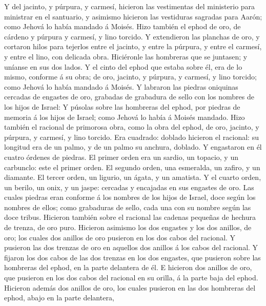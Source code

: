  Y del jacinto, y púrpura, y carmesí, hicieron las
vestimentas del ministerio para ministrar en el santuario, y asimismo
hicieron las vestiduras sagradas para Aarón; como Jehová lo había
mandado á Moisés.  Hizo también el ephod de oro, de cárdeno
y púrpura y carmesí, y lino torcido.  Y extendieron las
planchas de oro, y cortaron hilos para tejerlos entre el jacinto, y
entre la púrpura, y entre el carmesí, y entre el lino, con delicada
obra.  Hiciéronle las hombreras que se juntasen; y uníanse
en sus dos lados.  Y el cinto del ephod que estaba sobre él,
era de lo mismo, conforme á su obra; de oro, jacinto, y púrpura, y
carmesí, y lino torcido; como Jehová lo había mandado á Moisés.
 Y labraron las piedras oniquinas cercadas de engastes de
oro, grabadas de grabadura de sello con los nombres de los hijos de
Israel:  Y púsolas sobre las hombreras del ephod, por
piedras de memoria á los hijos de Israel; como Jehová lo había á Moisés
mandado.  Hizo también el racional de primorosa obra, como
la obra del ephod, de oro, jacinto, y púrpura, y carmesí, y lino
torcido.  Era cuadrado: doblado hicieron el racional: su
longitud era de un palmo, y de un palmo su anchura, doblado.
 Y engastaron en él cuatro órdenes de piedras. El primer
orden era un sardio, un topacio, y un carbunclo: este el primer orden.
 El segundo orden, una esmeralda, un zafiro, y un diamante.
 El tercer orden, un ligurio, un ágata, y un amatista.
 Y el cuarto orden, un berilo, un onix, y un jaspe:
cercadas y encajadas en sus engastes de oro.  Las cuales
piedras eran conforme á los nombres de los hijos de Israel, doce según
los nombres de ellos; como grabaduras de sello, cada una con su nombre
según las doce tribus.  Hicieron también sobre el racional
las cadenas pequeñas de hechura de trenza, de oro puro. 
Hicieron asimismo los dos engastes y los dos anillos, de oro; los cuales
dos anillos de oro pusieron en los dos cabos del racional. 
Y pusieron las dos trenzas de oro en aquellos dos anillos á los cabos
del racional.  Y fijaron los dos cabos de las dos trenzas
en los dos engastes, que pusieron sobre las hombreras del ephod, en la
parte delantera de él.  E hicieron dos anillos de oro, que
pusieron en los dos cabos del racional en su orilla, á la parte baja del
ephod.  Hicieron además dos anillos de oro, los cuales
pusieron en las dos hombreras del ephod, abajo en la parte delantera,
